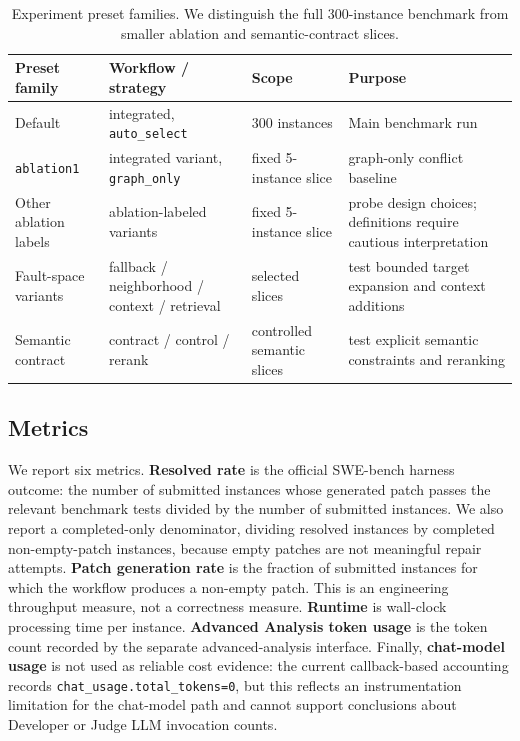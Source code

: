 \documentclass[11pt]{article}
\begin{document}
\begin{table}[t]
\centering
\small
\begin{tabular}{llll}
\toprule
Preset family & Workflow / strategy & Scope & Purpose \\
\midrule
Default & integrated, \texttt{auto\_select} & 300 instances & Main benchmark run \\
\texttt{ablation1} & integrated variant, \texttt{graph\_only} & fixed 5-instance slice & graph-only conflict baseline \\
Other ablation labels & ablation-labeled variants & fixed 5-instance slice & probe design choices; definitions require cautious interpretation \\
Fault-space variants & fallback / neighborhood / context / retrieval & selected slices & test bounded target expansion and context additions \\
Semantic contract & contract / control / rerank & controlled semantic slices & test explicit semantic constraints and reranking \\
\bottomrule
\end{tabular}
\caption{Experiment preset families.  We distinguish the full 300-instance benchmark from smaller ablation and semantic-contract slices.}
\label{tab:presets}
\end{table}

\subsection{Metrics}
\label{subsec:metrics}

We report six metrics.  \textbf{Resolved rate} is the official SWE-bench harness outcome: the number of submitted instances whose generated patch passes the relevant benchmark tests divided by the number of submitted instances.  We also report a completed-only denominator, dividing resolved instances by completed non-empty-patch instances, because empty patches are not meaningful repair attempts.  \textbf{Patch generation rate} is the fraction of submitted instances for which the workflow produces a non-empty patch.  This is an engineering throughput measure, not a correctness measure.  \textbf{Runtime} is wall-clock processing time per instance.  \textbf{Advanced Analysis token usage} is the token count recorded by the separate advanced-analysis interface.  Finally, \textbf{chat-model usage} is not used as reliable cost evidence: the current callback-based accounting records \texttt{chat\_usage.total\_tokens=0}, but this reflects an instrumentation limitation for the chat-model path and cannot support conclusions about Developer or Judge LLM invocation counts.
\end{document}
